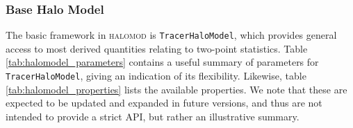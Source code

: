 \documentclass[5p,aas_macros]{elsarticle}
\begin{document}
\subsubsection{Base Halo Model}
\label{sec:halomod:frameworks:base}
The basic framework in \textsc{halomod} is \verb|TracerHaloModel|, which provides general access to most derived quantities relating to two-point statistics. Table \ref{tab:halomodel_parameters} contains a useful summary of parameters for \verb|TracerHaloModel|, giving an indication of its flexibility. Likewise, table \ref{tab:halomodel_properties} lists the available properties. We note that these are expected to be updated and expanded in future versions, and thus are not intended to provide a strict API, but rather an illustrative summary.


\end{document}

